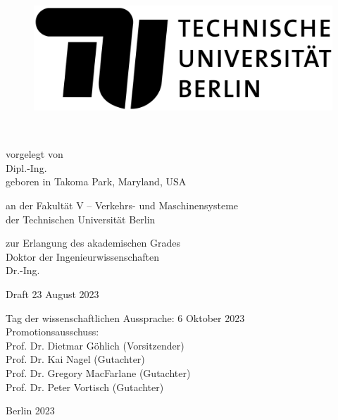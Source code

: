 
\thispagestyle{empty}

\begin{flushright}

	\begin{figure}[!h]
  	\begin{minipage}{1.62\linewidth}
	\begin{center}
	\includegraphics[scale=0.085]{chapters/title/tu-logo-2023.png}
  	\end{center}
  	\end{minipage}
	\end{figure}

	\vspace{20mm}

	\LARGE

	\textbf{\hspace{60mm}\Title} \\[2cm]

	\hrulefill

	\large
	vorgelegt von\\

	Dipl.-Ing. \Autor\\
	geboren in Takoma Park, Maryland, USA\\
	\vspace{10mm}

	an der Fakultät V -- Verkehrs- und Maschinensysteme\\
	der Technischen Universität Berlin

	zur Erlangung des akademischen Grades\\
	Doktor der Ingenieurwissenschaften\\
	Dr.-Ing.\\
	\vspace{5mm}

	Draft 23 August 2023\\

	\hrulefill

 	Tag der wissenschaftlichen Aussprache: 6 Oktober 2023\\

	\vspace{5mm}
	Promotionsausschuss:\\
	Prof. Dr. Dietmar Göhlich (Vorsitzender)\\
	Prof. Dr. Kai Nagel (Gutachter)\\
	Prof. Dr. Gregory MacFarlane (Gutachter)\\
	Prof. Dr. Peter Vortisch (Gutachter)\\
	\vspace{6mm}

	Berlin 2023\\

\end{flushright}